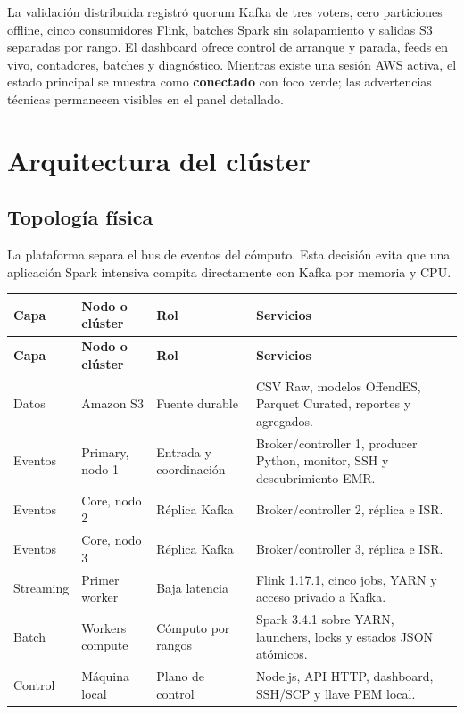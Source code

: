 \documentclass[11pt,a4paper,openany]{report}
\newcommand{\statusok}{\textcolor{leaf}{\textbf{conectado}}}
\begin{document}
La validación distribuida registró quorum Kafka de tres voters, cero particiones offline, cinco consumidores Flink, batches Spark sin solapamiento y salidas S3 separadas por rango. El dashboard ofrece control de arranque y parada, feeds en vivo, contadores, batches y diagnóstico. Mientras existe una sesión AWS activa, el estado principal se muestra como \statusok{} con foco verde; las advertencias técnicas permanecen visibles en el panel detallado.

\clearpage
{}

\chapter{Arquitectura del clúster}

\section{Topología física}

La plataforma separa el bus de eventos del cómputo. Esta decisión evita que una aplicación Spark intensiva compita directamente con Kafka por memoria y CPU.

\small
\begin{longtable}{>{\raggedright\arraybackslash}p{2.0cm}>{\raggedright\arraybackslash}p{3.1cm}>{\raggedright\arraybackslash}p{3.2cm}>{\raggedright\arraybackslash}p{5.8cm}}
\toprule
\textbf{Capa} & \textbf{Nodo o clúster} & \textbf{Rol} & \textbf{Servicios}\\
\midrule
\endfirsthead
\toprule
\textbf{Capa} & \textbf{Nodo o clúster} & \textbf{Rol} & \textbf{Servicios}\\
\midrule
\endhead
Datos & Amazon S3 & Fuente durable & CSV Raw, modelos OffendES, Parquet Curated, reportes y agregados.\\
Eventos & Primary, nodo 1 & Entrada y coordinación & Broker/controller 1, producer Python, monitor, SSH y descubrimiento EMR.\\
Eventos & Core, nodo 2 & Réplica Kafka & Broker/controller 2, réplica e ISR.\\
Eventos & Core, nodo 3 & Réplica Kafka & Broker/controller 3, réplica e ISR.\\
Streaming & Primer worker & Baja latencia & Flink 1.17.1, cinco jobs, YARN y acceso privado a Kafka.\\
Batch & Workers compute & Cómputo por rangos & Spark 3.4.1 sobre YARN, launchers, locks y estados JSON atómicos.\\
Control & Máquina local & Plano de control & Node.js, API HTTP, dashboard, SSH/SCP y llave PEM local.\\
\bottomrule
\end{longtable}
\normalsize
\end{document}
